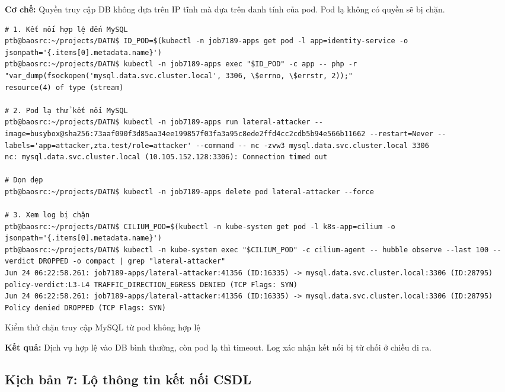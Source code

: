 \textbf{Cơ chế:} Quyền truy cập DB không dựa trên IP tĩnh mà dựa trên danh tính của pod. Pod lạ không có quyền sẽ bị chặn.

\begin{listing}[H]
\begin{verbatim}
# 1. Kết nối hợp lệ đến MySQL
ptb@baosrc:~/projects/DATN$ ID_POD=$(kubectl -n job7189-apps get pod -l app=identity-service -o jsonpath='{.items[0].metadata.name}')
ptb@baosrc:~/projects/DATN$ kubectl -n job7189-apps exec "$ID_POD" -c app -- php -r "var_dump(fsockopen('mysql.data.svc.cluster.local', 3306, \$errno, \$errstr, 2));"
resource(4) of type (stream)

# 2. Pod lạ thử kết nối MySQL
ptb@baosrc:~/projects/DATN$ kubectl -n job7189-apps run lateral-attacker --image=busybox@sha256:73aaf090f3d85aa34ee199857f03fa3a95c8ede2ffd4cc2cdb5b94e566b11662 --restart=Never --labels='app=attacker,zta.test/role=attacker' --command -- nc -zvw3 mysql.data.svc.cluster.local 3306
nc: mysql.data.svc.cluster.local (10.105.152.128:3306): Connection timed out

# Dọn dẹp
ptb@baosrc:~/projects/DATN$ kubectl -n job7189-apps delete pod lateral-attacker --force

# 3. Xem log bị chặn
ptb@baosrc:~/projects/DATN$ CILIUM_POD=$(kubectl -n kube-system get pod -l k8s-app=cilium -o jsonpath='{.items[0].metadata.name}')
ptb@baosrc:~/projects/DATN$ kubectl -n kube-system exec "$CILIUM_POD" -c cilium-agent -- hubble observe --last 100 --verdict DROPPED -o compact | grep "lateral-attacker"
Jun 24 06:22:58.261: job7189-apps/lateral-attacker:41356 (ID:16335) -> mysql.data.svc.cluster.local:3306 (ID:28795) policy-verdict:L3-L4 TRAFFIC_DIRECTION_EGRESS DENIED (TCP Flags: SYN)
Jun 24 06:22:58.261: job7189-apps/lateral-attacker:41356 (ID:16335) -> mysql.data.svc.cluster.local:3306 (ID:28795) Policy denied DROPPED (TCP Flags: SYN)
\end{verbatim}
\caption{Kiểm thử chặn truy cập MySQL từ pod không hợp lệ}
\label{lst:c3_kb6}
\end{listing}

\textbf{Kết quả:} Dịch vụ hợp lệ vào DB bình thường, còn pod lạ thì timeout. Log xác nhận kết nối bị từ chối ở chiều đi ra.

\subsection{Kịch bản 7: Lộ thông tin kết nối CSDL}
\label{subsec:c3_kb7}

